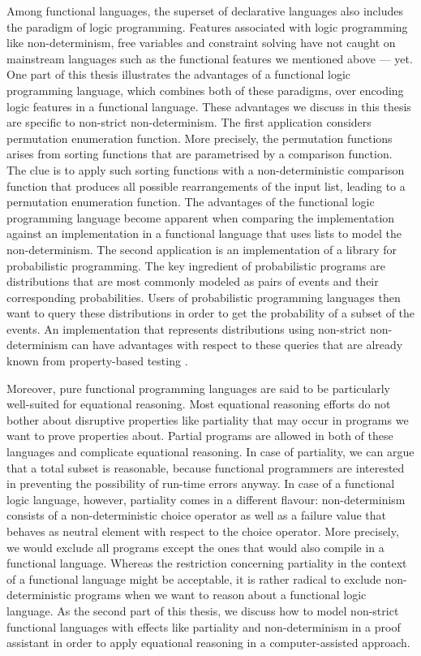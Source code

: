 Among functional languages, the superset of declarative languages also includes the paradigm of logic programming.
Features associated with logic programming like non\--determinism, free variables and constraint solving have not caught on mainstream languages such as the functional features we mentioned above --- yet.
One part of this thesis illustrates the advantages of a functional logic programming language, which combines both of these paradigms, over encoding logic features in a functional language.
These advantages we discuss in this thesis are specific to non\--strict non\--determinism.
The first application considers permutation enumeration function.
More precisely, the permutation functions arises from sorting functions that are parametrised by a comparison function.
The clue is to apply such sorting functions with a non\--deterministic comparison function that produces all possible rearrangements of the input list, leading to a permutation enumeration function.
The advantages of the functional logic programming language become apparent when comparing the implementation against an implementation in a functional language that uses lists to model the non\--determinism.
The second application is an implementation of a library for probabilistic programming.
The key ingredient of probabilistic programs are distributions that are most commonly modeled as pairs of events and their corresponding probabilities.
Users of probabilistic programming languages then want to query these distributions in order to get the probability of a subset of the events.
An implementation that represents distributions using non\--strict non\--determinism can have advantages with respect to these queries that are already known from property\--based testing \citep{christiansen2008easycheck,runciman2008smallcheck}.

Moreover, pure functional programming languages are said to be particularly well\--suited for equational reasoning.
Most equational reasoning efforts do not bother about disruptive properties like partiality that may occur in programs we want to prove properties about.
Partial programs are allowed in both of these languages and complicate equational reasoning.
In case of partiality, we can argue that a total subset is reasonable, because functional programmers are interested in preventing the possibility of run\--time errors anyway.
In case of a functional logic language, however, partiality comes in a different flavour: non\--determinism consists of a non\--deterministic choice operator as well as a failure value that behaves as neutral element with respect to the choice operator.
More precisely, we would exclude all programs except the ones that would also compile in a functional language.
Whereas the restriction concerning partiality in the context of a functional language might be acceptable, it is rather radical to exclude non\--deterministic programs when we want to reason about a functional logic language.
As the second part of this thesis, we discuss how to model non\--strict functional languages with effects like partiality and non\--determinism in a proof assistant in order to apply equational reasoning in a computer\--assisted approach.

